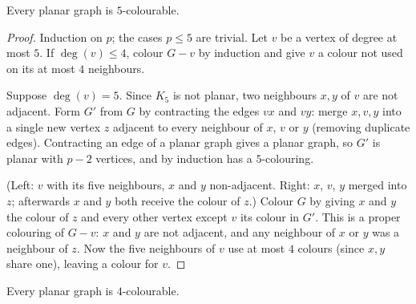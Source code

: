 \begin{theorem}
Every planar graph is $5$-colourable.
\end{theorem}
\begin{proof}
Induction on $p$; the cases $p\le5$ are trivial. Let $v$ be a vertex of degree at most $5$. If
$\deg(v) \le 4$, colour $G - v$ by induction and give $v$ a colour not used on its at most $4$
neighbours.

Suppose $\deg(v) = 5$. Since $K_5$ is not planar, two neighbours $x, y$ of $v$ are not adjacent.
Form $G'$ from $G$ by contracting the edges $vx$ and $vy$: merge $x, v, y$ into a single new
vertex $z$ adjacent to every neighbour of $x$, $v$ or $y$ (removing duplicate edges). Contracting
an edge of a planar graph gives a planar graph, so $G'$ is planar with $p - 2$ vertices, and by
induction has a $5$-colouring.
\begin{center}
\end{center}
(Left: $v$ with its five neighbours, $x$ and $y$ non-adjacent. Right: $x$, $v$, $y$ merged into
$z$; afterwards $x$ and $y$ both receive the colour of $z$.)
 Colour $G$ by giving $x$ and $y$ the colour of $z$ and every other
vertex except $v$ its colour in $G'$. This is a proper colouring of $G - v$: $x$ and $y$ are not
adjacent, and any neighbour of $x$ or $y$ was a neighbour of $z$. Now the five neighbours of $v$
use at most $4$ colours (since $x, y$ share one), leaving a colour for $v$.
\end{proof}

\begin{theorem}
Every planar graph is $4$-colourable.
\end{theorem}

